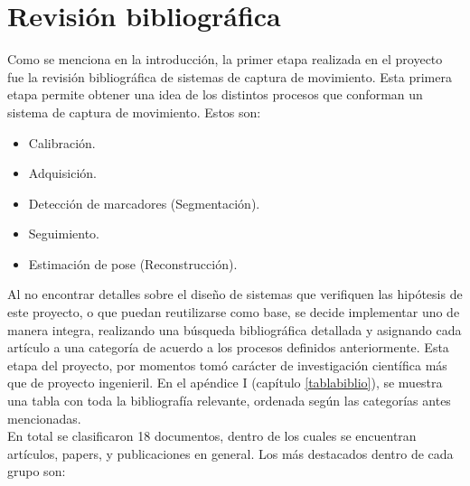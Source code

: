 \chapter{Revisión bibliográfica}
\label{invBiblio}

Como se menciona en la introducción, la primer etapa realizada en el proyecto fue la revisión bibliográfica de sistemas de captura de movimiento. Esta primera etapa permite obtener una idea de los distintos procesos que conforman un sistema de captura de movimiento. Estos son:

\begin{itemize}
	\item Calibración.
	\item Adquisición.
	\item Detección de marcadores (Segmentación).
	\item Seguimiento.
	\item Estimación de pose (Reconstrucción).
\end{itemize}

Al no encontrar detalles sobre el diseño de sistemas que verifiquen las hipótesis de este proyecto, o que puedan reutilizarse como base, se decide implementar uno de manera integra, realizando una búsqueda bibliográfica detallada y asignando cada artículo a una categoría de acuerdo a los procesos definidos anteriormente. Esta etapa del proyecto, por momentos tomó carácter de investigación científica más que de proyecto ingenieril. 
En el apéndice I (capítulo \ref{tablabiblio}), se muestra una tabla con toda la bibliografía relevante, ordenada según las categorías antes mencionadas.
\\ 

En total se clasificaron 18 documentos, dentro de los cuales se encuentran artículos, papers, y publicaciones en general. Los más destacados dentro de cada grupo son:

